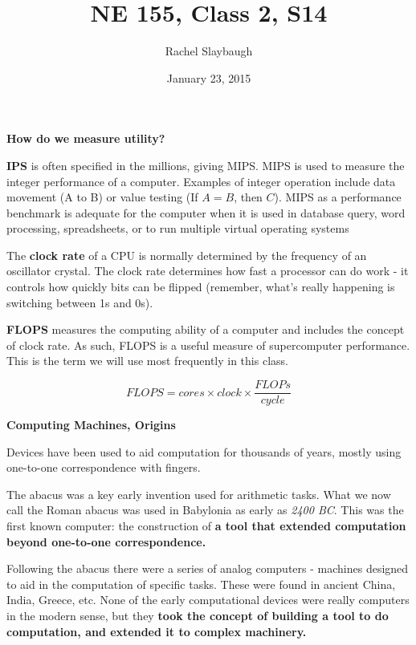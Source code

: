 \documentclass[12pt]{article}
\title{NE 155, Class 2, S14}
\author{Rachel Slaybaugh}
\date{January 23, 2015}
\begin{document}
\maketitle

\noindent \textbf{How do we measure utility?}

\textbf{IPS} is often specified in the millions, giving MIPS. MIPS is used to measure the integer performance of a computer. Examples of integer operation include data movement (A to B) or value testing (If $A = B$, then $C$). MIPS as a performance benchmark is adequate for the computer when it is used in database query, word processing, spreadsheets, or to run multiple virtual operating systems %

The \textbf{clock rate} of a CPU is normally determined by the frequency of an oscillator crystal. The clock rate determines how fast a processor can do work - it controls how quickly bits can be flipped (remember, what's really happening is switching between 1s and 0s).

\textbf{FLOPS} measures the computing ability of a computer and includes the concept of clock rate. As such, FLOPS is a useful measure of supercomputer performance. This is the term we will use most frequently in this class. 

\begin{equation}
FLOPS = cores \times clock \times \frac{FLOPs}{cycle} \nonumber
\end{equation}

\vspace*{2em}
\noindent \textbf{Computing Machines, Origins}

Devices have been used to aid computation for thousands of years, mostly using one-to-one correspondence with fingers. 

The abacus was a key early invention used for arithmetic tasks. What we now call the Roman abacus was used in Babylonia as early as \textit{2400 BC}. This was the first known computer: the construction of \textbf{a tool that extended computation beyond one-to-one correspondence.} 

Following the abacus there were a series of analog computers - machines designed to aid in the computation of specific tasks. These were found in ancient China, India, Greece, etc. None of the early computational devices were really computers in the modern sense, but they \textbf{took the concept of building a tool to do computation, and extended it to complex machinery.}
\end{document}
